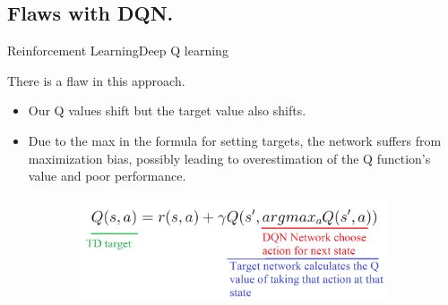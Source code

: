 \documentclass[10pt]{beamer}
\begin{document}

\subsection{Flaws with DQN.}

\begin{frame}{Reinforcement Learning}{Deep Q learning}
\item There is a flaw in this approach.
\pause
\begin{itemize}
\item Our Q values shift but the target value also shifts. 
\end{itemize}
\pause
\begin{itemize}
\item Due to the max in the formula for setting targets, the network suffers from maximization bias, possibly leading to overestimation of the Q function’s value and poor performance.
\end{itemize}
 
\begin{figure}[!htb]
\centering
\begin{subfigure}[t]{0.5\linewidth}
\includegraphics[width=1.5\textwidth]{assets/ddqn_equation.png}
\end{subfigure}
\vspace{0.1in}
\label{fig:tripEmb}
\end{figure}

\end{frame}


\end{document}
